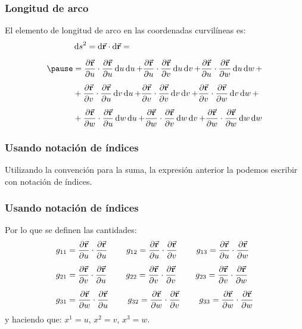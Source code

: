 \documentclass[12pt]{beamer}
\begin{document}
\begin{frame}
\frametitle{Longitud de arco}
El elemento de longitud de arco en las coordenadas curvilíneas es:
\pause
\begin{equation}
\begin{aligned}
&\dd{s}^{2} = \dd{\va{r}} \cdot \dd{\va{r}} = \\[0.5em] \pause
&= \pdv{\va{r}}{u} \cdot \pdv{\va{r}}{u} \dd{u} \dd{u} {+} \pdv{\va{r}}{u} \cdot \pdv{\va{r}}{v} \dd{u} \dd{v} {+} \pdv{\va{r}}{u} \cdot \pdv{\va{r}}{w} \dd{u} \dd{w} + \\[0.5em]
&+ \pdv{\va{r}}{v} \cdot \pdv{\va{r}}{u} \dd{v} \dd{u} {+} \pdv{\va{r}}{v} \cdot \pdv{\va{r}}{v} \dd{v} \dd{v} {+} \pdv{\va{r}}{v} \cdot \pdv{\va{r}}{w} \dd{v} \dd{w} + \\[0.5em]
&+ \pdv{\va{r}}{w} \cdot \pdv{\va{r}}{u} \dd{w} \dd{u} {+} \pdv{\va{r}}{w} \cdot \pdv{\va{r}}{v} \dd{w} \dd{v} {+} \pdv{\va{r}}{w} \cdot \pdv{\va{r}}{w} \dd{w} \dd{w}
\end{aligned}
\label{eq:ecuacion_01_03_12}
\end{equation}
\end{frame}
\begin{frame}
\frametitle{Usando notación de índices}
Utilizando la convención para la suma, la expresión anterior la podemos escribir con notación de índices.
\end{frame}
\begin{frame}
\frametitle{Usando notación de índices}
Por lo que se definen las cantidades:
\pause
\begin{align*}
g_{11} &= \pdv{\va{r}}{u} \cdot \pdv{\va{r}}{u} \hspace{0.8cm} g_{12} = \pdv{\va{r}}{u} \cdot \pdv{\va{r}}{v} \hspace{0.8cm} g_{13} = \pdv{\va{r}}{u} \cdot \pdv{\va{r}}{w} \\[0.5em]
g_{21} &= \pdv{\va{r}}{v} \cdot \pdv{\va{r}}{u} \hspace{0.8cm} g_{22} = \pdv{\va{r}}{v} \cdot \pdv{\va{r}}{v} \hspace{0.8cm} g_{23} = \pdv{\va{r}}{v} \cdot \pdv{\va{r}}{w} \\[0.5em]
g_{31} &= \pdv{\va{r}}{w} \cdot \pdv{\va{r}}{u} \hspace{0.8cm} g_{32} = \pdv{\va{r}}{w} \cdot \pdv{\va{r}}{v} \hspace{0.8cm} g_{33} = \pdv{\va{r}}{w} \cdot \pdv{\va{r}}{w}
\end{align*}
y haciendo que: $x^{1} = u$, $x^{2} = v$, $x^{3} = w$.
\end{frame}
\end{document}
